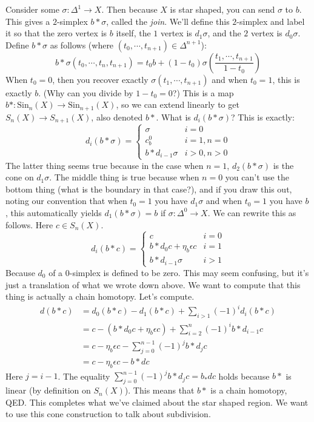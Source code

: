 \documentclass{amsart}
\theoremstyle{theorem}
\theoremstyle{definition}
\newcommand{\Sin}{\mathrm{Sin}}
\begin{document}
Consider some $\sigma:\Delta^1\to X$. Then because $X$ is star shaped, you can send $\sigma$ to $b$. This gives a $2$-simplex $b\ast \sigma$, called the \emph{join}. We'll define this $2$-simplex and label it so that the zero vertex is $b$ itself, the $1$ vertex is $d_1\sigma$, and the $2$ vertex is $d_0\sigma$. Define $b\ast\sigma$ as follows (where $(t_0,\cdots,t_{n+1})\in \Delta^{n+1}$):
\begin{equation*}
b\ast\sigma(t_0,\cdots,t_n,t_{n+1})=t_0b + (1-t_0)\sigma\left(\frac{t_1,\cdots,t_{n+1}}{1-t_0}\right)
\end{equation*}
When $t_0=0$, then you recover exactly $\sigma(t_1,\cdots,t_{n+1})$ and when $t_0=1$, this is exactly $b$. (Why can you divide by $1-t_0=0$?) This is a map $b\ast:\Sin_n(X)\to\Sin_{n+1}(X)$, so we can extend linearly to get $S_n(X)\to S_{n+1}(X)$, also denoted $b\ast$. What is $d_i(b\ast\sigma)$? This is exactly:
\begin{equation*}
d_i(b\ast\sigma)=\begin{cases}\sigma & i=0 \\ 
c^0_b & i=1,n=0\\
b\ast d_{i-1}\sigma & i>0,n>0\end{cases}
\end{equation*}
The latter thing seems true because in the case when $n=1$, $d_2(b\ast\sigma)$ is the cone on $d_1\sigma$. The middle thing is true because when $n=0$ you can't use the bottom thing (what is the boundary in that case?), and if you draw this out, noting our convention that when $t_0=1$ you have $d_1\sigma$ and when $t_0=1$ you have $b$, this automatically yields $d_1(b\ast\sigma)=b$ if $\sigma:\Delta^0\to X$. We can rewrite this as follows. Here $c\in S_n(X)$.
\begin{equation*}
d_i(b\ast c)=\begin{cases}
c & i=0\\
b\ast d_0c + \eta_b\epsilon c & i=1\\
b\ast d_{i-1}\sigma & i>1
\end{cases}
\end{equation*}
Because $d_0$ of a $0$-simplex is defined to be zero. This may seem confusing, but it's just a translation of what we wrote down above. We want to compute that this thing is actually a chain homotopy. Let's compute.
\begin{align*}
d(b\ast c)& = d_0(b\ast c) - d_1(b\ast c) + \sum_{i>1}(-1)^i d_i(b\ast c)\\
& = c-(b\ast d_0c + \eta_b\epsilon c) + \sum_{i=2}^n (-1)^ib\ast d_{i-1}c\\
& = c-\eta_b\epsilon c - \sum_{j=0}^{n-1}(-1)^jb\ast d_jc\\
& = c-\eta_b\epsilon c - b\ast dc
\end{align*}
Here $j=i-1$. The equality $\sum_{j=0}^{n-1}(-1)^jb\ast d_jc=b_\ast dc$ holds because $b\ast$ is linear (by definition on $S_n(X)$). This means that $b\ast$ is a chain homotopy, QED. This completes what we've claimed about the star shaped region. We want to use this cone construction to talk about subdivision.
\end{document}
